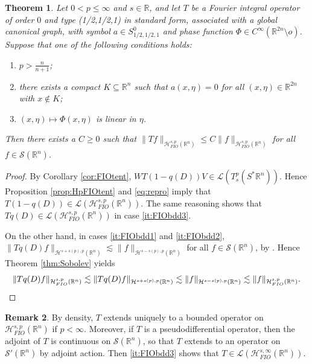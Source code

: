 \documentclass{amsart}
\newcommand {\HT}{\mathcal{H}}
\newcommand {\Hps}{\mathcal{H}^{s,p}_{FIO}(\Rn)}
\newcommand {\La}{\mathcal{L}}
\newcommand {\R}{\mathbb R}
\newcommand {\Rn}{\mathbb{R}^{n}}
\newcommand {\Sp}{S^{*}\Rn}
\newcommand {\Sw}{\mathcal{S}}
\newtheorem{theorem}{Theorem}[section]
\theoremstyle{definition}
\newtheorem{remark}[theorem]{Remark}
\numberwithin{equation}{section}
\begin{document}
\begin{theorem}\label{thm:FIObdd}
Let $0<p\leq\infty$ and $s\in\R$, and let $T$ be a Fourier integral operator of order $0$ and type (1/2,1/2,1) in standard form, associated with a global canonical graph, with symbol $a\in S^{0}_{1/2,1/2,1}$ and phase function $\Phi\in C^{\infty}(\R^{2n}\setminus o)$. Suppose that one of the following conditions holds:
\begin{enumerate}
\item\label{it:FIObdd1} $p>\frac{n}{n+1}$;
\item\label{it:FIObdd2} there exists a compact $K\subseteq\Rn$ such that $a(x,\eta)=0$ for all $(x,\eta)\in\R^{2n}$ with $x\notin K$;
\item\label{it:FIObdd3} $(x,\eta)\mapsto \Phi(x,\eta)$ is linear in $\eta$.
\end{enumerate}
Then there exists a $C\geq0$ such that $\|Tf\|_{\Hps}\leq C\|f\|_{\Hps}$ for all $f\in\Sw(\Rn)$.
\end{theorem}
\begin{proof}
By Corollary \ref{cor:FIOtent}, $WT(1-q(D))V\in\La(T^{p}_{s}(\Sp))$. Hence Proposition \ref{prop:HpFIOtent} and \eqref{eq:repro} imply that $T(1-q(D))\in \La(\Hps)$. The same reasoning shows that $Tq(D)\in \La(\Hps)$ in case \eqref{it:FIObdd3}.

On the other hand, in cases \eqref{it:FIObdd1} and \eqref{it:FIObdd2}, $\|Tq(D)f\|_{\HT^{s+s(p),p}(\Rn)}\lesssim \|f\|_{\HT^{s-s(p),p}(\Rn)}$ for all $f\in\Sw(\Rn)$, by \cite[Theorem 6.5]{IsRoSt21}. Hence Theorem \ref{thm:Sobolev} yields
\[
\|Tq(D)f\|_{\Hps}\lesssim \|Tq(D)f\|_{\HT^{s+s(p),p}(\Rn)}\lesssim \|f\|_{\HT^{s-s(p),p}(\Rn)}\lesssim \|f\|_{\Hps}.\qedhere
\]
\end{proof}

\begin{remark}\label{rem:extensioninfty}
By density, $T$ extends uniquely to a bounded operator on $\Hps$ if $p<\infty$.  %
Moreover, if $T$ is a pseudodifferential operator, then the adjoint of $T$ is continuous on $\Sw(\Rn)$, so that $T$ extends to an operator on $\Sw'(\Rn)$ by adjoint action. Then \eqref{it:FIObdd3} shows that $T\in\La(\HT^{s,\infty}_{FIO}(\Rn))$. 
\end{remark}
\end{document}
